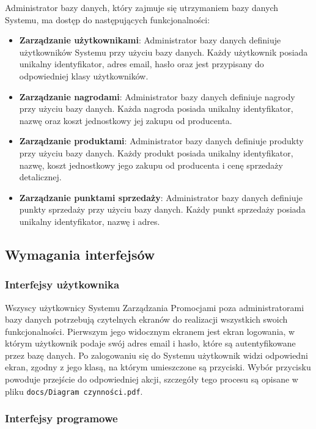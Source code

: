 \documentclass[a4paper,12pt]{article}
\begin{document}
Administrator bazy danych, który zajmuje się utrzymaniem bazy danych Systemu, ma dostęp do następujących funkcjonalności:
\begin{itemize}
    \item \textbf{Zarządzanie użytkownikami}:
    Administrator bazy danych definiuje użytkowników Systemu przy użyciu bazy danych.
    Każdy użytkownik posiada unikalny identyfikator, adres email, hasło oraz jest przypisany do odpowiedniej klasy użytkowników.
    \item \textbf{Zarządzanie nagrodami}:
    Administrator bazy danych definiuje nagrody przy użyciu bazy danych.
    Każda nagroda posiada unikalny identyfikator, nazwę oraz koszt jednostkowy jej zakupu od producenta.
    \item \textbf{Zarządzanie produktami}:
    Administrator bazy danych definiuje produkty przy użyciu bazy danych.
    Każdy produkt posiada unikalny identyfikator, nazwę, koszt jednostkowy jego zakupu od producenta i cenę sprzedaży detalicznej.
    \item \textbf{Zarządzanie punktami sprzedaży}:
    Administrator bazy danych definiuje punkty sprzedaży przy użyciu bazy danych.
    Każdy punkt sprzedaży posiada unikalny identyfikator, nazwę i adres.
\end{itemize}

\subsection{Wymagania interfejsów}

\subsubsection{Interfejsy użytkownika}

Wszyscy użytkownicy Systemu Zarządzania Promocjami poza administratorami bazy danych potrzebują czytelnych ekranów do realizacji wszystkich swoich funkcjonalności.
Pierwszym jego widocznym ekranem jest ekran logowania, w którym użytkownik podaje swój adres email i hasło, które są autentyfikowane przez bazę danych.
Po zalogowaniu się do Systemu użytkownik widzi odpowiedni ekran, zgodny z jego klasą, na którym umieszczone są przyciski.
Wybór przycisku powoduje przejście do odpowiedniej akcji, szczegóły tego procesu są opisane w pliku \texttt{docs/Diagram czynności.pdf}.

\subsubsection{Interfejsy programowe}
\end{document}
